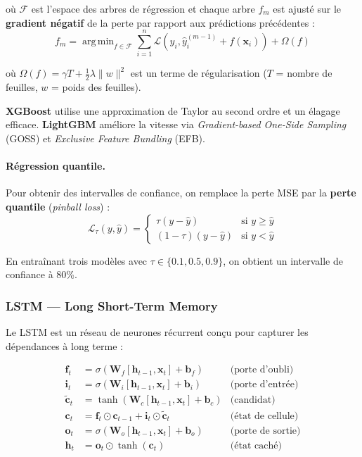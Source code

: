 \documentclass[12pt,a4paper]{article}
\DeclareMathOperator*{\argmin}{arg\,min}
\begin{document}
o\`u $\mathcal{F}$ est l'espace des arbres de r\'egression et chaque arbre $f_m$ est ajust\'e sur le \textbf{gradient n\'egatif} de la perte par rapport aux pr\'edictions pr\'ec\'edentes :
\begin{equation}
f_m = \argmin_{f \in \mathcal{F}} \sum_{i=1}^n \mathcal{L}\left(y_i, \hat{y}_i^{(m-1)} + f(\bm{x}_i)\right) + \Omega(f)
\end{equation}

o\`u $\Omega(f) = \gamma T + \frac{1}{2}\lambda \|w\|^2$ est un terme de r\'egularisation ($T$ = nombre de feuilles, $w$ = poids des feuilles).

\textbf{XGBoost} \cite{chen2016} utilise une approximation de Taylor au second ordre et un \'elagage efficace. \textbf{LightGBM} \cite{ke2017} am\'eliore la vitesse via \textit{Gradient-based One-Side Sampling} (GOSS) et \textit{Exclusive Feature Bundling} (EFB).

\paragraph{R\'egression quantile.} Pour obtenir des intervalles de confiance, on remplace la perte MSE par la \textbf{perte quantile} (\textit{pinball loss}) :
\begin{equation}
\boxed{\mathcal{L}_\tau(y, \hat{y}) = \begin{cases}
\tau (y - \hat{y}) & \text{si } y \geq \hat{y} \\
(1-\tau)(y - \hat{y}) & \text{si } y < \hat{y}
\end{cases}}
\label{eq:quantile_loss}
\end{equation}

En entra\^inant trois mod\`eles avec $\tau \in \{0.1, 0.5, 0.9\}$, on obtient un intervalle de confiance \`a 80\%.

\subsubsection{LSTM --- Long Short-Term Memory}

Le LSTM \cite{hochreiter1997} est un r\'eseau de neurones r\'ecurrent con\c{c}u pour capturer les d\'ependances \`a long terme :

\begin{align}
\bm{f}_t &= \sigma(\bm{W}_f [\bm{h}_{t-1}, \bm{x}_t] + \bm{b}_f) & \text{(porte d'oubli)} \\
\bm{i}_t &= \sigma(\bm{W}_i [\bm{h}_{t-1}, \bm{x}_t] + \bm{b}_i) & \text{(porte d'entr\'ee)} \\
\tilde{\bm{c}}_t &= \tanh(\bm{W}_c [\bm{h}_{t-1}, \bm{x}_t] + \bm{b}_c) & \text{(candidat)} \\
\bm{c}_t &= \bm{f}_t \odot \bm{c}_{t-1} + \bm{i}_t \odot \tilde{\bm{c}}_t & \text{(\'etat de cellule)} \\
\bm{o}_t &= \sigma(\bm{W}_o [\bm{h}_{t-1}, \bm{x}_t] + \bm{b}_o) & \text{(porte de sortie)} \\
\bm{h}_t &= \bm{o}_t \odot \tanh(\bm{c}_t) & \text{(\'etat cach\'e)}
\end{align}
\end{document}
